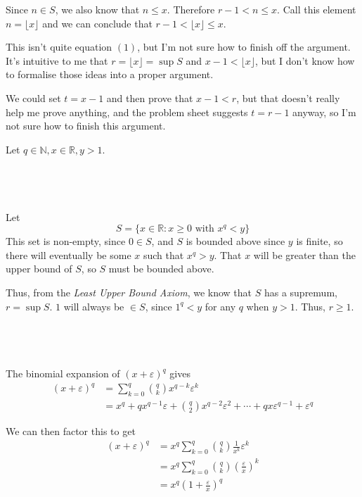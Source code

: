 \documentclass[a4paper]{article}
\begin{document}
Since $n \in S$, we also know that $n \le x$. Therefore $r - 1 < n \le x$. Call this element $n = \lfloor x \rfloor$ and we can conclude that $r - 1 < \lfloor x \rfloor \le x$.

This isn't quite equation $(1)$, but I'm not sure how to finish off the argument. It's intuitive to me that $r = \lfloor x \rfloor = \sup S$ and $x - 1 < \lfloor x \rfloor$, but I don't know how to formalise those ideas into a proper argument.

We could set $t = x - 1$ and then prove that $x - 1 < r$, but that doesn't really help me prove anything, and the problem sheet suggests $t = r - 1$ anyway, so I'm not sure how to finish this argument.


Let $q \in \mathbb N, x \in \mathbb R, y > 1$.

\subsection{~}

Let $$S = \{x \in \mathbb R : x \ge 0 \text{ with } x^q < y\}$$
This set is non-empty, since $0 \in S$, and $S$ is bounded above since $y$ is finite, so there will eventually be some $x$ such that $x^q > y$. That $x$ will be greater than the upper bound of $S$, so $S$ must be bounded above.

Thus, from the \textit{Least Upper Bound Axiom}, we know that $S$ has a supremum, $r = \sup S$. $1$ will always be $\in S$, since $1^q < y$ for any $q$ when $y > 1$. Thus, $r \ge 1$.

\subsection{~}

The binomial expansion of $(x + \varepsilon)^q$ gives \begin{align*}
	(x + \varepsilon)^q &= \sum_{k=0}^q \binom{q}{k} x^{q-k} \varepsilon^k\\[1ex]
						&= x^q + q x^{q-1} \varepsilon + \binom{q}{2} x^{q-2} \varepsilon^2 + \cdots + q x \varepsilon^{q-1} + \varepsilon^q
\end{align*}

We can then factor this to get \begin{align*}
	(x + \varepsilon)^q &= x^q \sum_{k=0}^q \binom{q}{k} \frac1{x^k} \varepsilon^k\\[1ex]
						&= x^q \sum_{k=0}^q \binom{q}{k} \left( \frac{\varepsilon}{x} \right)^k\\[1ex]
						&= x^q \left( 1 + \frac{\varepsilon}{x} \right)^q\\[1ex]
\end{align*}
\end{document}
